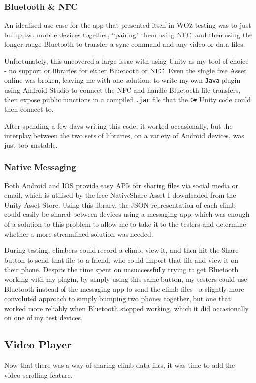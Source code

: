 \subsubsection{Bluetooth & NFC}
An idealised use-case for the app that presented itself in WOZ testing was to just bump two mobile devices together, ``pairing" them using NFC, and then using the longer-range Bluetooth to transfer a sync command and any video or data files.

Unfortunately, this uncovered a large issue with using Unity as my tool of choice - no support or libraries for either Bluetooth or NFC. 
Even the single free Asset online was broken, leaving me with one solution: to write my own \verb|Java| plugin using Android Studio to connect the NFC and handle Bluetooth file transfers, then expose public functions in a compiled \verb|.jar| file that the \verb|C#| Unity code could then connect to.

After spending a few days writing this code, it worked occasionally, but the interplay between the two sets of libraries, on a variety of Android devices, was just too unstable.

\subsubsection{Native Messaging}
Both Android and IOS provide easy APIs for sharing files via social media or email, which is utilised by the free NativeShare Asset I downloaded from the Unity Asset Store.
Using this library, the JSON representation of each climb could easily be shared between devices using a messaging app, which was enough of a solution to this problem to allow me to take it to the testers and determine whether a more streamlined solution was needed.

During testing, climbers could record a climb, view it, and then hit the Share button to send that file to a friend, who could import that file and view it on their phone.
Despite the time spent on unsuccessfully trying to get Bluetooth working with my plugin, by simply using this same button, my testers could use Bluetooth instead of the messaging app to send the climb files - a slightly more convoluted approach to simply bumping two phones together, but one that worked more reliably when Bluetooth stopped working, which it did occasionally on one of my test devices.


\subsection{Video Player}
Now that there was a way of sharing climb-data-files, it was time to add the video-scrolling feature.

